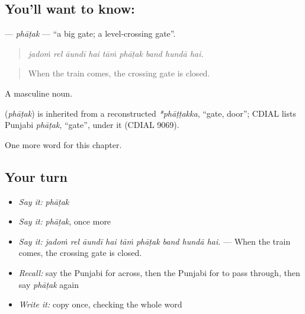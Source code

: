 \subsection*{You'll want to know: }
\textbf{} — \emph{phāṭak} — \textquotedblleft{}a big gate; a level-crossing gate\textquotedblright{}.

\begin{quote}
        
\end{quote}

\begin{quote}
\emph{jadoṁ rel āundī hai tāṁ phāṭak band hundā hai.}
\end{quote}

\begin{quote}
When the train comes, the crossing gate is closed.
\end{quote}

A masculine noun.

\begin{cousinweb}
\textbf{} (\emph{phāṭak}) is inherited from a reconstructed \emph{*phāṭṭakka}, \textquotedblleft{}gate, door\textquotedblright{}; CDIAL lists Punjabi \emph{phāṭak}, \textquotedblleft{}gate\textquotedblright{}, under it (CDIAL 9069).
\end{cousinweb}

\begin{grammarlens}[title={What you've built}]
One more word for this chapter.
\end{grammarlens}

\subsection*{Your turn}
\begin{itemize}
\raggedright
  \item \emph{Say it:} \emph{phāṭak}
  \item \emph{Say it:} \emph{phāṭak}, once more
  \item \emph{Say it:} \emph{jadoṁ rel āundī hai tāṁ phāṭak band hundā hai.} — When the train comes, the crossing gate is closed.
  \item \emph{Recall:} say the Punjabi for across, then the Punjabi for to pass through, then say \emph{phāṭak} again
  \item \emph{Write it:} copy \textbf{} once, checking the whole word
\end{itemize}

